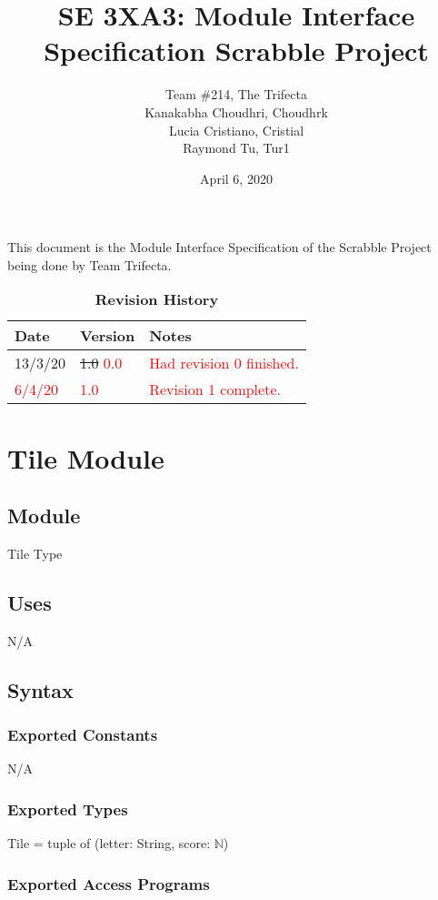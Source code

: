 \documentclass[12pt]{article}
\title{SE 3XA3: Module Interface Specification Scrabble Project}
\author{Team \#214, The Trifecta
		\\ Kanakabha Choudhri, Choudhrk
		\\ Lucia Cristiano, Cristial
		\\ Raymond Tu, Tur1
}
\date{April 6, 2020}
\begin{document}
 
\maketitle

This document is the Module Interface Specification of the Scrabble Project being done by Team Trifecta. 

\begin{table}[bp]
\caption{\bf Revision History}
\begin{tabularx}{\textwidth}{p{3cm}p{2cm}X}
\toprule {\bf Date} & {\bf Version} & {\bf Notes}\\
\midrule
13/3/20 & \sout{1.0} \textcolor{red}{0.0} & \textcolor{red}{Had revision 0 finished.}\\
\textcolor{red}{6/4/20} & \textcolor{red}{1.0} & \textcolor{red}{Revision 1 complete.}\\
\bottomrule
\end{tabularx}
\end{table}

\newpage

\section* {Tile Module}

\subsection*{Module}

Tile Type

\subsection* {Uses}
N/A

\subsection* {Syntax}

\subsubsection* {Exported Constants}
N/A
\subsubsection* {Exported Types}
Tile = tuple of (letter: String, score: $\mathbb{N}$)

\subsubsection* {Exported Access Programs}
\end{document}
